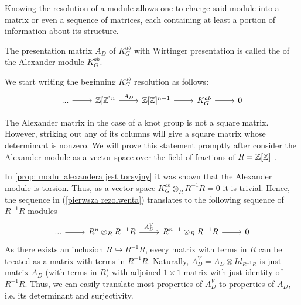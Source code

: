 Knowing the resolution of a module allows one to change said module into a matrix or even a sequence of matrices, each containing at least a portion of information about its structure.

\begin{definition}
  The presentation matrix $A_D$ of $K_G^{ab}$ with Wirtinger presentation is called the  of the Alexander module $K_G^{ab}$.
\end{definition}

We start writing the beginning $K_G^{ab}$ resolution as follows:
\begin{equation}\label{pierwsza rezolwenta}
  \begin{tikzcd}
    ...\arrow[r] & \Z[\Z]^{n}\arrow[r, "A_D"] & \Z[\Z]^{n-1}\arrow[r] & K_G^{ab}\arrow[r] & 0
  \end{tikzcd}
\end{equation}



The Alexander matrix in the case of a knot group is not a square matrix. However, striking out any of its columns will give a square matrix whose determinant is nonzero. We will prove this statement promptly after consider the Alexander module as a vector space over the field of fractions of $R=\operatorname{\mathbb{Z}}[\operatorname{\mathbb{Z}}]$ \cite[Chapter~3]{atiyah}.

In \cref{prop: modul alexandera jest torsyjny} it was shown that the Alexander module is torsion. Thus, as a vector space $K_G^{ab}\otimes_R R^{-1}R=0$ it is trivial. Hence, the sequence in (\ref{pierwsza rezolwenta}) translates to the following sequence of $R^{-1}R$ modules
\begin{equation}\label{resolution vector spaces}
  \begin{tikzcd}
    ...\arrow[r] & R^n\otimes_R R^{-1}R \arrow[r, "A_D^V"] & R^{n-1}\otimes_R R^{-1}R \arrow[r] & 0
  \end{tikzcd}
\end{equation}
As there exists an inclusion $R\hookrightarrow R^{-1}R$, every matrix with terms in $R$ can be treated as a matrix with terms in $R^{-1}R$. Naturally, $A_D^V=A_D\otimes Id_{R^{-1}R}$ is just matrix $A_D$ (with terms in $R$) with adjoined $1\times 1$ matrix with just identity of $R^{-1}R$. Thus, we can easily translate most properties of $A_D^V$ to properties of $A_D$, i.e. its determinant and surjectivity.%

